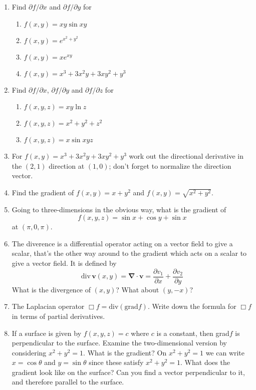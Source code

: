 \documentclass[12pt]{article}
\begin{document}
\begin{enumerate}


\item Find $\partial f/\partial x$ and $\partial f/\partial y$ for 
\begin{enumerate}
\item $f(x,y)=xy\sin{xy}$
\item $f(x,y)=e^{x^2+y^2}$
\item $f(x,y)=xe^{xy}$
\item $f(x,y)=x^3+3x^2y+3xy^2+y^3$
\end{enumerate}


\item Find $\partial f/\partial x$, $\partial f/\partial y$ and $\partial f/\partial z$ for 
\begin{enumerate}
\item $f(x,y,z)=xy\ln{z}$
\item $f(x,y,z)=x^2+y^2+z^2$
\item $f(x,y,z)=x\sin{xyz}$
\end{enumerate}

\item For $f(x,y)=x^3+3x^2y+3xy^2+y^3$ work out the directional
  derivative in the $(2,1)$ direction at $(1,0)$; don't forget to
  normalize the direction vector.

\item Find the gradient of $f(x,y)=x+y^2$ and $f(x,y)=\sqrt{x^2+y^2}$.

\item Going to three-dimensions in the obvious way, what is the
  gradient of 
\begin{equation}
f(x,y,z)=\sin{x}+\cos{y}+\sin{x}
\end{equation}
at $(\pi,0,\pi)$.

\item The diverence is a differential operator acting on a vector
  field to give a scalar, that's the other way around to the gradient
  which acts on a scalar to give a vector field. It is defined by
  \begin{equation}
    \mbox{div}\,\mathbf{v}(x,y)=\mathbf{\nabla}\cdot\mathbf{v}=\frac{\partial v_1}{\partial x}+\frac{\partial v_2}{\partial y}
\end{equation}
What is the divergence of $(x,y)$? What about $(y,-x)$?

\item The Laplacian operator $\Box f=\mbox{div}(\mbox{grad}f)$. Write down the formula for $\Box f$ in terms of partial derivatives.

\item If a surface is given by $f(x,y,z)=c$ where $c$ is a constant,
  then grad$f$ is perpendicular to the surface. Examine the
  two-dimensional version by considering $x^2+y^2=1$. What is the
  gradient? On $x^2+y^2=1$ we can write $x=\cos{\theta}$ and
  $y=\sin{\theta}$ since these satisfy $x^2+y^2=1$. What does the
  gradient look like on the surface? Can you find a vector
  perpendicular to it, and therefore parallel to the surface.

\end{enumerate}
\end{document}
